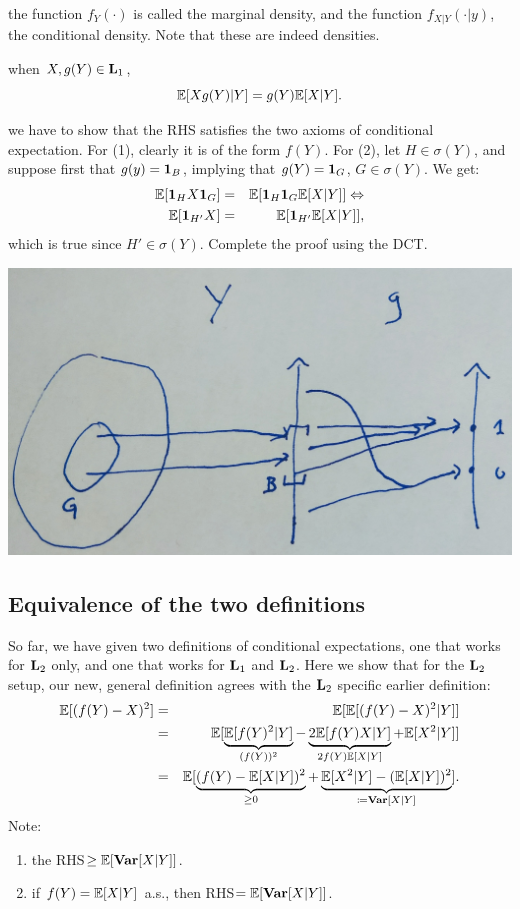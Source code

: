 \documentclass{article}
\begin{document}
 the function $f_Y(\cdot)$ is called the marginal density, and the function $f_{X|Y}(\cdot|y)$, the conditional density. Note that these are indeed densities. 

 when $X,g(Y) \in \mathbf L_1$, \[ {\mathbb E}[ X g(Y) | Y] = g(Y) {\mathbb E}[X|Y]. \]

 we have to show that the RHS satisfies the two axioms of conditional expectation. For (1), clearly it is of the form $f(Y)$. For (2), let $H \in \sigma(Y)$, and suppose first that $g(y) = {\mathbf 1}_B$, implying that $g(Y) = {\mathbf 1}_G$, $G \in \sigma(Y)$. We get:
\begin{eqnarray*}
{\mathbb E}[ {\mathbf 1}_H X {\mathbf 1}_G ] &=& {\mathbb E}[ {\mathbf 1}_H {\mathbf 1}_G {\mathbb E}[X|Y] ] \Leftrightarrow \\
{\mathbb E}[ {\mathbf 1}_{H'} X ] &=& {\mathbb E}[ {\mathbf 1}_{H'} {\mathbb E}[X|Y] ],
\end{eqnarray*}
which is true since $H' \in \sigma(Y)$. Complete the proof using the DCT.
\begin{center}
	\includegraphics[width=0.6\linewidth]{figures/cond-exp-property} 
\end{center}


\subsection{Equivalence of the two definitions}

So far, we have given two definitions of conditional expectations, one that works for $\mathbf L_2$ only, and one that works for $\mathbf L_1$ and $\mathbf L_2$. Here we show that for the $\mathbf L_2$ setup, our new, general definition agrees with the $\mathbf L_2$ specific earlier definition:
\begin{eqnarray*}
{\mathbb E}[ (f(Y) - X)^2 ] &=& {\mathbb E}[ {\mathbb E}[ (f(Y) - X)^2 | Y ]] \\
&=& {\mathbb E} [ \underbrace{ {\mathbb E}[ f(Y)^2 | Y ]}_{(f(Y))^2} - \underbrace{ 2 {\mathbb E}[ f(Y) X | Y] }_{2 f(Y) {\mathbb E}[X|Y]} + {\mathbb E}[ X^2 | Y] ] \\
&=& {\mathbb E}[ \underbrace{(f(Y) - {\mathbb E}[X|Y])^2}_{\ge 0} + \underbrace{ {\mathbb E}[X^2 | Y] - ({\mathbb E}[X|Y])^2 }_{\coloneqq {\text {\bf Var}}[X|Y]} ].
\end{eqnarray*}
Note:
\begin{enumerate}
  \item the RHS$\ge {\mathbb E}[ {\text {\bf Var}}[X|Y]]$.
  \item if $f(Y) = {\mathbb E}[X|Y]$ a.s., then RHS$={\mathbb E}[{\text {\bf Var}}[X|Y]]$.
\end{enumerate}
\end{document}
